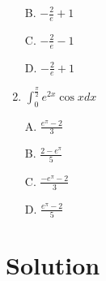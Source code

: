 \documentclass{article}
\numberwithin{equation}{section}
\begin{document}
\begin{enumerate}
    B. $\displaystyle -\frac{2}{e} +1$

    C. $\displaystyle -\frac{2}{e} - 1$

    D. $\displaystyle -\frac{2}{e} +1$

    \item $\displaystyle \int_{0}^{\frac{\pi}{2}} e^{2x}\cos x dx$
    
    A. $\displaystyle \frac{e^\pi - 2}{3}$

    B. $\displaystyle \frac{2-e^\pi}{5}$

    C. $\displaystyle \frac{-e^\pi - 2}{3}$

    D. $\displaystyle \frac{e^\pi - 2}{5}$
\end{enumerate}

\newpage 
\section{Solution}
\end{document}

